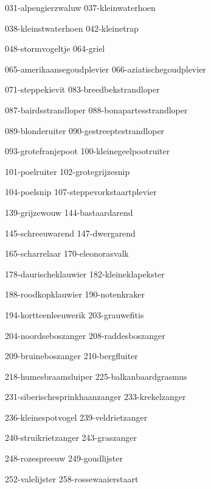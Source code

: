 \begin{figure*}[h!]
    \centering
    \subfig
    {031-alpengierzwaluw}
    {037-kleinwaterhoen}

    \subfig
    {038-kleinstwaterhoen}
    {042-kleinetrap}

    \subfig
    {048-stormvogeltje}
    {064-griel}

    \subfig
    {065-amerikaansegoudplevier}
    {066-aziatischegoudplevier}
    
    \subfig
    {071-steppekievit}
    {083-breedbekstrandloper}

    \subfig
    {087-bairdsstrandloper}
    {088-bonapartesstrandloper}
\end{figure*}


\begin{figure*}[h!]
    \centering
    \subfig
    {089-blonderuiter}
    {090-gestreeptestrandloper}

    \subfig
    {093-grotefranjepoot}
    {100-kleinegeelpootruiter}

    \subfig
    {101-poelruiter}
    {102-grotegrijzesnip}

    \subfig
    {104-poelsnip}
    {107-steppevorkstaartplevier}

    \subfig
    {139-grijzewouw}
    {144-bastaardarend}

    \subfig
    {145-schreeuwarend}
    {147-dwergarend}
\end{figure*}

\begin{figure*}[h!]
    \centering
    \subfig
    {165-scharrelaar}
    {170-eleonorasvalk}

    \subfig
    {178-daurischeklauwier}
    {182-kleineklapekster}

    \subfig
    {188-roodkopklauwier}
    {190-notenkraker}

    \subfig
    {194-kortteenleeuwerik}
    {203-grauwefitis}

    \subfig
    {204-noordseboszanger}
    {208-raddesboszanger}
    
    \subfig
    {209-bruineboszanger}
    {210-bergfluiter}

\end{figure*}

\begin{figure*}[h!]
    \centering
    \subfig
    {218-humesbraamsluiper}
    {225-balkanbaardgrasmus}

    \subfig
    {231-siberischesprinkhaanzanger}
    {233-krekelzanger}
    
    
    \subfig
    {236-kleinespotvogel}
    {239-veldrietzanger}

    \subfig
    {240-struikrietzanger}
    {243-graszanger}
    
    \subfig
    {248-rozespreeuw}
    {249-goudlijster}

    \subfig
    {252-valelijster}
    {258-rossewaaierstaart}
\end{figure*}


